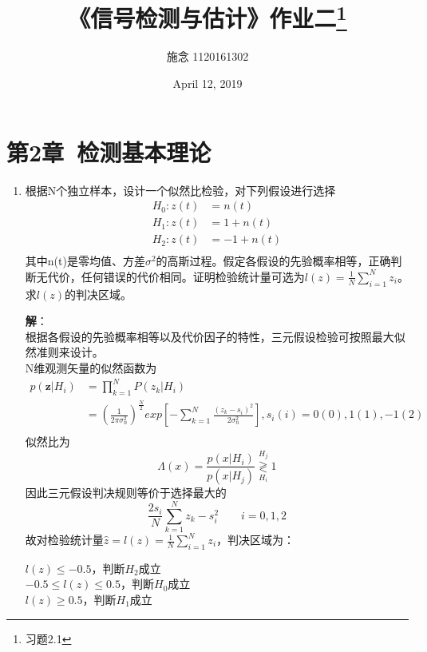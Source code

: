 \documentclass{article}
\begin{document}
\title{《信号检测与估计》作业二\footnote{习题2.1}}
\author{施念  1120161302}
\date{April 12, 2019}
\maketitle{}
\section{第2章\ 检测基本理论}
\begin{enumerate}[1.]
\item 
根据N个独立样本，设计一个似然比检验，对下列假设进行选择
\begin{equation*}
\begin{split}
H_0:z(t)&=n(t)\\
H_1:z(t)&=1+n(t)\\
H_2:z(t)&=-1+n(t)\\
\end{split}
\end{equation*}
其中n(t)是零均值、方差$\sigma^2$的高斯过程。假定各假设的先验概率相等，正确判断无代价，任何错误的代价相同。证明检验统计量可选为$l(z)=\frac{1}{N}\sum_{i=1}^{N}z_i$。求$l(z)$的判决区域。

\textbf{解}：\\
根据各假设的先验概率相等以及代价因子的特性，三元假设检验可按照最大似然准则来设计。\\
N维观测矢量的似然函数为
\begin{equation*}
\begin{split}
p(\mathbf{z}|H_i)&=\prod_{k=1}^{N} P(z_k|H_i)\\
&=\left(  \frac{1}{2\pi\sigma _n^2} \right)^{\frac{N}{2}}exp\left[ -\sum_{k=1}^{N} \frac{(z_k-s_i)^2}{2\sigma_n^2}  \right],s_i(i)=0(0),1(1),-1(2)\\
\end{split}
\end{equation*}
似然比为
\[\Lambda (x) = \frac{{p(x|{H_i})}}{{p(x|{H_j})}}\mathop{\gtrless}\limits_{H_i}^{H_j}1\]
因此三元假设判决规则等价于选择最大的
\[\frac{{2{s_i}}}{N}\sum\limits_{k = 1}^N {{z_k} - s_i^2\qquad i = 0,1,2} \]
故对检验统计量$\hat z = l(z)=\frac{1}{N}\sum_{i=1}^{N}z_i$，判决区域为：
\begin{center}
$l(z)\le-0.5$，判断$H_2$成立\\
$-0.5\le l(z)\le0.5$，判断$H_0$成立\\
$l(z)\ge0.5$，判断$H_1$成立\\
\end{center}



\end{enumerate}
\end{document}
